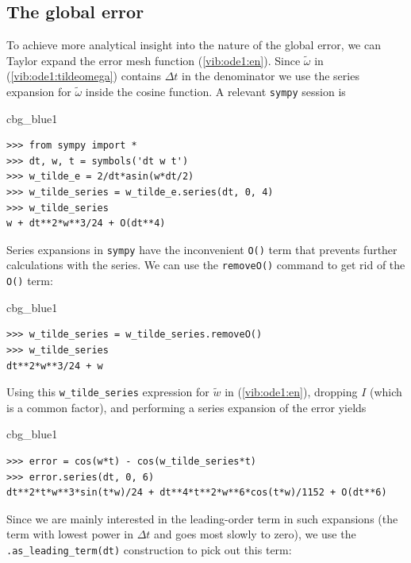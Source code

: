 \documentclass[%
oneside,                 %
final,                   %
10pt]{article}
\newenvironment{_cod_tight}[1]{
   \def\FrameCommand{\colorbox{#1}}
   \FrameRule0.6pt\MakeFramed {\FrameRestore}\vskip3mm}
   {\vskip0mm\endMakeFramed}
\newenvironment{cod}[1]{
\bgroup\rmfamily
\fboxsep=0mm\relax
\begin{_cod_tight}{#1}
\list{}{\parsep=-2mm\parskip=0mm\topsep=0pt\leftmargin=2mm
\rightmargin=2\leftmargin\leftmargin=4pt\relax}
\item\relax}
{\endlist\end{_cod_tight}\egroup}
\begin{document}
\subsection{The global error}


To achieve more analytical insight into the nature of the global error,
we can Taylor expand the error mesh function (\ref{vib:ode1:en}).
Since $\tilde\omega$ in (\ref{vib:ode1:tildeomega})
contains $\Delta t$ in the denominator we use the series expansion
for $\tilde\omega$ inside the cosine function. A relevant \texttt{sympy}
session is

\begin{cod}{cbg_blue1}\begin{Verbatim}[numbers=none,fontsize=\fontsize{9pt}{9pt},baselinestretch=0.95,xleftmargin=2mm]
>>> from sympy import *
>>> dt, w, t = symbols('dt w t')
>>> w_tilde_e = 2/dt*asin(w*dt/2)
>>> w_tilde_series = w_tilde_e.series(dt, 0, 4)
>>> w_tilde_series
w + dt**2*w**3/24 + O(dt**4)
\end{Verbatim}
\end{cod}
\noindent
Series expansions in \texttt{sympy} have the inconvenient \texttt{O()} term that
prevents further calculations with the series. We can use the
\texttt{removeO()} command to get rid of the \texttt{O()} term:

\begin{cod}{cbg_blue1}\begin{Verbatim}[numbers=none,fontsize=\fontsize{9pt}{9pt},baselinestretch=0.95,xleftmargin=2mm]
>>> w_tilde_series = w_tilde_series.removeO()
>>> w_tilde_series
dt**2*w**3/24 + w
\end{Verbatim}
\end{cod}
\noindent
Using this \Verb!w_tilde_series! expression
for $\tilde w$ in (\ref{vib:ode1:en}),
dropping $I$ (which is a common factor), and performing a series
expansion of the error yields

\begin{cod}{cbg_blue1}\begin{Verbatim}[numbers=none,fontsize=\fontsize{9pt}{9pt},baselinestretch=0.95,xleftmargin=2mm]
>>> error = cos(w*t) - cos(w_tilde_series*t)
>>> error.series(dt, 0, 6)
dt**2*t*w**3*sin(t*w)/24 + dt**4*t**2*w**6*cos(t*w)/1152 + O(dt**6)
\end{Verbatim}
\end{cod}
\noindent
Since we are mainly interested in the leading-order term in
such expansions (the term with lowest power in $\Delta t$ and
goes most slowly to zero), we use the \Verb!.as_leading_term(dt)!
construction to pick out this term:
\end{document}
